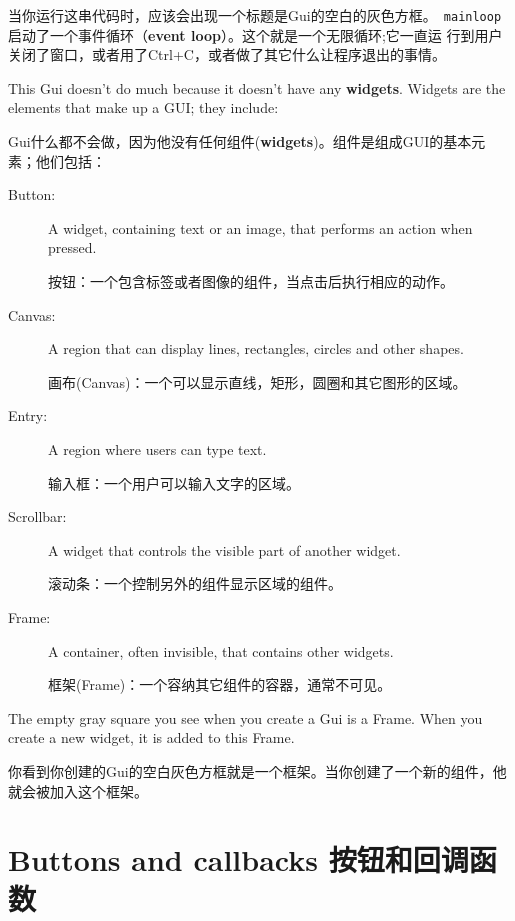 \documentclass[10pt]{book}
\begin{document}
\begin{CJK}{UTF8}{gbsn}
当你运行这串代码时，应该会出现一个标题是{\sf Gui}的空白的灰色方框。{\tt
mainloop}启动了一个事件循环（{\bf event loop}）。这个就是一个无限循环;它一直运
行到用户关闭了窗口，或者用了Ctrl+C，或者做了其它什么让程序退出的事情。

This Gui doesn't do much because it doesn't have any
{\bf widgets}.  Widgets are the elements that make up a
GUI; they include:

Gui什么都不会做，因为他没有任何组件({\bf widgets})。组件是组成GUI的基本元素；他们包括：

\begin{description}

\item[Button:] A widget, containing text or an image, that
performs an action when pressed.

按钮：一个包含标签或者图像的组件，当点击后执行相应的动作。

\item[Canvas:] A region that can display lines, rectangles,
circles and other shapes.

画布(Canvas)：一个可以显示直线，矩形，圆圈和其它图形的区域。

\item[Entry:] A region where users can type text.

    输入框：一个用户可以输入文字的区域。

\item[Scrollbar:] A widget that controls the visible part of another
widget.

滚动条：一个控制另外的组件显示区域的组件。

\item[Frame:] A container, often invisible, that contains other
widgets.

框架(Frame)：一个容纳其它组件的容器，通常不可见。

\end{description}

The empty gray square you see when you create a Gui is
a Frame.  When you create a new widget, it is added to this Frame.

你看到你创建的Gui的空白灰色方框就是一个框架。当你创建了一个新的组件，他就会被加入这个框架。

\section{Buttons and callbacks  按钮和回调函数}


\end{CJK}
\end{document}
